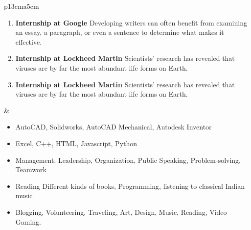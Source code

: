 \documentclass{article}
\begin{document}
{\begin{longtable}{ p{13cm}a{5cm} }
\begin{enumerate}
	\item {\textbf{Internship at Google}}\hfill \textit{}\newline
	Developing writers can often benefit from examining an essay, a paragraph, or even a sentence to determine what makes it effective.
	\item {\textbf{Internship at Lockheed Martin}}\hfill \textit{}\newline
	 Scientists' research has revealed that viruses are by far the most abundant life forms on Earth. 
	 \item {\textbf{Internship at Lockheed Martin}}\hfill \textit{}\newline
	 Scientists' research has revealed that viruses are by far the most abundant life forms on Earth.
	 
\end{enumerate}

&
\newline
{}
\newline

{}\newline

\begin{itemize}[noitemsep,nolistsep]
	\item AutoCAD, Solidworks, AutoCAD Mechanical, Autodesk Inventor
	\item Excel, C++, HTML, Javascript, Python
	\item Management, Leadership, Organization, Public Speaking, Problem-solving, Teamwork\newline
\end{itemize}


{}\newline

\begin{itemize}[noitemsep,nolistsep]
	\item Reading Different kinds of books, Programming, listening to classical Indian music
	\item Blogging, Volunteering, Traveling, Art, Design, Music, Reading, Video Gaming.\newline
\end{itemize}




\end{longtable}}
\end{document}
